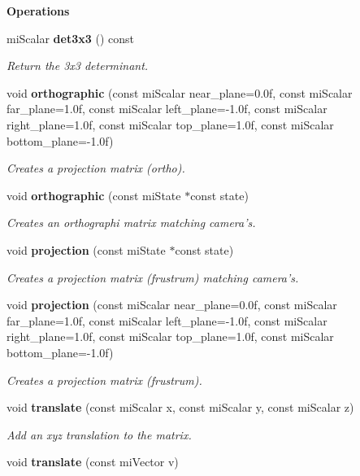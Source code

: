 \begin{Indent}{\bf Operations}
\begin{CompactItemize}
mi\-Scalar {\bf det3x3} () const 
\begin{CompactList}\small\item\em Return the 3x3 determinant. \item\end{CompactList}\item 
void {\bf orthographic} (const mi\-Scalar near\_\-plane=0.0f, const mi\-Scalar far\_\-plane=1.0f, const mi\-Scalar left\_\-plane=-1.0f, const mi\-Scalar right\_\-plane=1.0f, const mi\-Scalar top\_\-plane=1.0f, const mi\-Scalar bottom\_\-plane=-1.0f)
\begin{CompactList}\small\item\em Creates a projection matrix (ortho). \item\end{CompactList}\item 
void {\bf orthographic} (const mi\-State $\ast$const state)
\begin{CompactList}\small\item\em Creates an orthographi matrix matching camera's. \item\end{CompactList}\item 
void {\bf projection} (const mi\-State $\ast$const state)
\begin{CompactList}\small\item\em Creates a projection matrix (frustrum) matching camera's. \item\end{CompactList}\item 
void {\bf projection} (const mi\-Scalar near\_\-plane=0.0f, const mi\-Scalar far\_\-plane=1.0f, const mi\-Scalar left\_\-plane=-1.0f, const mi\-Scalar right\_\-plane=1.0f, const mi\-Scalar top\_\-plane=1.0f, const mi\-Scalar bottom\_\-plane=-1.0f)
\begin{CompactList}\small\item\em Creates a projection matrix (frustrum). \item\end{CompactList}\item 
void {\bf translate} (const mi\-Scalar x, const mi\-Scalar y, const mi\-Scalar z)
\begin{CompactList}\small\item\em Add an xyz translation to the matrix. \item\end{CompactList}\item 
void {\bf translate} (const mi\-Vector v)

\end{CompactItemize}
\end{Indent}
